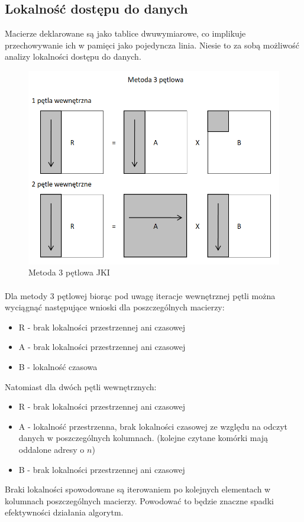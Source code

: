 \documentclass{scrartcl}
\begin{document}
\subsection{Lokalność dostępu do danych}
Macierze deklarowane są jako tablice dwuwymiarowe, co implikuje przechowywanie ich w pamięci jako pojedyncza linia. Niesie to za sobą możliwość analizy lokalności dostępu do danych.
\begin{figure}[h]
\includegraphics[width=\textwidth]{3petlowa.png}
\caption{Metoda 3 pętlowa JKI}
\end{figure}
\paragraph{}
Dla metody 3 pętlowej biorąc pod uwagę iteracje wewnętrznej pętli można wyciągnąć następujące wnioski dla poszczególnych macierzy: \\
\begin{itemize}
\item R - brak lokalności przestrzennej ani czasowej
\item A - brak lokalności przestrzennej ani czasowej
\item B - lokalność czasowa
\end{itemize}
Natomiast dla dwóch pętli wewnętrznych:
\begin{itemize}
\item R - brak lokalności przestrzennej ani czasowej
\item A - lokalność przestrzenna, brak lokalności czasowej ze względu na odczyt danych w poszczególnych kolumnach. (kolejne czytane komórki mają oddalone adresy o $n$)
\item B - brak lokalności przestrzennej ani czasowej
\end{itemize}
Braki lokalności spowodowane są iterowaniem po kolejnych elementach w kolumnach poszczególnych macierzy. Powodować to będzie znaczne spadki efektywności działania algorytm.
\end{document}
